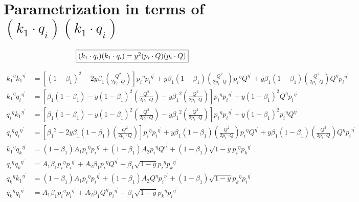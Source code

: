\section{Parametrization in terms of $ (k_1 \cdot q_i )(k_1 \cdot q_i) $}
\begin{equation}
	\begin{aligned}
		\fbox{$  (k_1 \cdot q_i )(k_1 \cdot q_i)  = y^2(p_i \cdot Q)(p_i \cdot Q) $}
    \end{aligned}
\end{equation}

\begin{equation}
\begin{split}
{k_1}^{{\eta}}{k_1}^{{\eta}^{\prime}}&=[(1-\beta_1)^2-2y {\beta_1} (\frac{Q^2}{2p_i \cdot Q})] {p_i}^{{\eta}}{p_i}^{{\eta}^{\prime}}+y {\beta_1}(1-\beta_1) (\frac{Q^2}{2p_i \cdot Q}){p_i}^{{\eta}}{Q}^{{\eta}^{\prime}}+y {\beta_1}(1-\beta_1) (\frac{Q^2}{2p_i \cdot Q}){Q}^{{\eta}}{p_i}^{{\eta}^{\prime}}\\
{k_1}^{{\eta}}{q_i}^{{\eta}^{\prime}}&=[\beta_1(1-\beta_1)-y (1-{\beta_1})^2 (\frac{Q^2}{2p_i \cdot Q})-y {\beta_1}^2 (\frac{Q^2}{2p_i \cdot Q})] {p_i}^{{\eta}}{p_i}^{{\eta}^{\prime}}+y (1-\beta_1)^2 {Q}^{{\eta}}{p_i}^{{\eta}^{\prime}}\\
{q_i}^{{\eta}}{k_1}^{{\eta}^{\prime}}&=[\beta_1(1-\beta_1)-y (1-{\beta_1})^2 (\frac{Q^2}{2p_i \cdot Q})-y {\beta_1}^2 (\frac{Q^2}{2p_i \cdot Q})] {p_i}^{{\eta}}{p_i}^{{\eta}^{\prime}}+y (1-\beta_1)^2 {p_i}^{{\eta}}{Q}^{{\eta}^{\prime}}\\
{q_i}^{{\eta}}{q_i}^{{\eta}^{\prime}}&=[{\beta_1}^2 -2y \beta_1 (1-{\beta_1}) (\frac{Q^2}{2p_i \cdot Q})]{p_i}^{{\eta}}{p_i}^{{\eta}^{\prime}}+y {\beta_1}(1-\beta_1) (\frac{Q^2}{2p_i \cdot Q}){p_i}^{{\eta}}{Q}^{{\eta}^{\prime}}+y {\beta_1}(1-\beta_1) (\frac{Q^2}{2p_i \cdot Q}){Q}^{{\eta}}{p_i}^{{\eta}^{\prime}}\\
{k_1}^{{\eta}}{q_k}^{{\eta}^{\prime}}&= (1-\beta_1)A_1{p_i}^{{\eta}}{{p_i}^{{\eta}^{\prime}}}+(1-\beta_1)A_2{p_i}^{{\eta}}{{Q}^{{\eta}^{\prime}}}+(1-\beta_1)\sqrt{1-y}{p_i}^{{\eta}}{{p_k}^{{\eta}^{\prime}}}\\
{q_i}^{{\eta}}{q_k}^{{\eta}^{\prime}}&=A_1\beta_1 {p_i}^{{\eta}}{{p_i}^{{\eta}^{\prime}}}+A_2\beta_1 {p_i}^{{\eta}}{{Q}^{{\eta}^{\prime}}}+\beta_1 \sqrt{1-y}{p_i}^{{\eta}}{{p_k}^{{\eta}^{\prime}}}\\
{q_k}^{\eta}{k_1}^{{{\eta}}^{\prime}}&=(1-\beta_1)A_1{p_i}^{{\eta}}{{p_i}^{{\eta}^{\prime}}}+(1-\beta_1)A_2{Q}^{{\eta}}{{p_i}^{{\eta}^{\prime}}}+(1-\beta_1)\sqrt{1-y}{p_k}^{{\eta}}{{p_i}^{{\eta}^{\prime}}}\\
{q_k}^{\eta}{q_i}^{{{\eta}}^{\prime}}&=A_1\beta_1 {p_i}^{{\eta}}{{p_i}^{{\eta}^{\prime}}}+A_2\beta_1 {Q}^{{\eta}}{{p_i}^{{\eta}^{\prime}}}+\beta_1 \sqrt{1-y}{p_k}^{{\eta}}{{p_i}^{{\eta}^{\prime}}}\\
\end{split}
\end{equation}
\newpage